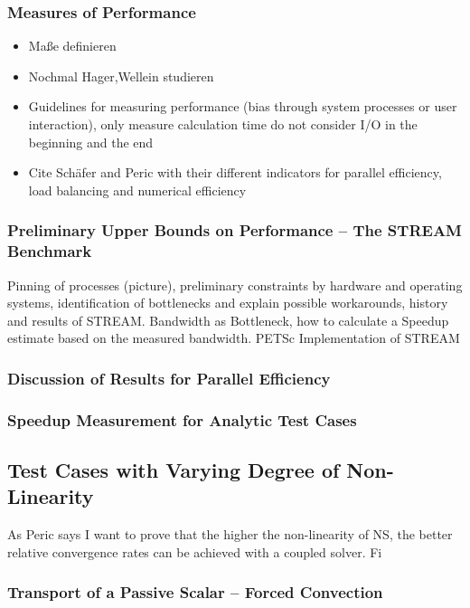 \documentclass[article,type=msc,colorback,accentcolor=tud2a]{tudthesis}
\begin{document}
      \subsubsection{Measures of Performance}
        \begin{itemize}
          \item Maße definieren
          \item Nochmal Hager,Wellein studieren
          \item Guidelines for measuring performance (bias through system processes or user interaction), only measure calculation time do not consider I/O in the beginning and the end
          \item Cite Schäfer and Peric with their different indicators for parallel efficiency, load balancing and numerical efficiency
        \end{itemize}
      \subsubsection{Preliminary Upper Bounds on Performance -- The STREAM Benchmark}
        Pinning of processes (picture), preliminary constraints by hardware and operating systems, identification of bottlenecks and explain possible workarounds, history and results of STREAM. Bandwidth as Bottleneck, how to calculate a Speedup estimate based on the measured bandwidth. PETSc Implementation of STREAM

      \subsubsection{Discussion of Results for Parallel Efficiency}
      \subsubsection{Speedup Measurement for Analytic Test Cases}

    \subsection{Test Cases with Varying Degree of Non-Linearity}
      
      As Peric says I want to prove that the higher the non-linearity of NS, the better relative convergence rates can be achieved with a coupled solver. Fi

      \subsubsection{Transport of a Passive Scalar -- Forced Convection}
\end{document}
